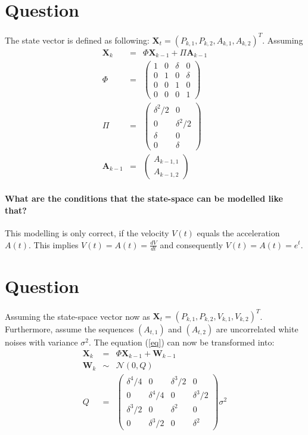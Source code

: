 \documentclass[a4paper, 12pt, titlepage]{article}
\begin{document}
\section{Question}

The state vector is defined as following: $\pmb{X}_t=(P_{k,1},P_{k,2},A_{k,1},A_{k,2})^T$.
Assuming 
\begin{eqnarray}
	\pmb{X}_{k} &=& \Phi \pmb{X}_{k-1} + \Pi \pmb{A}_{k-1} \label{eq}\\
	\Phi &=& \left(
		\begin{array}{cccc}
			1 &0 & \delta & 0\\
			0 & 1& 0 & \delta\\
			0 & 0& 1& 0\\
			0 & 0& 0& 1
		\end{array}
	\right)\\
	\Pi &=& \left(
		\begin{array}{cc}
			\delta^2/2 & 0\\
			0 & \delta^2/2\\
			\delta& 0\\
			0 & \delta
		\end{array}
	\right)\\
	\pmb{A}_{k-1} &=& \left (
		\begin{array}{c}
			A_{k-1,1}\\
			A_{k-1,2}
		\end{array}
	\right)
\end{eqnarray}

\paragraph{What are the conditions that the state-space can be modelled like that?}
This modelling is only correct, if the velocity $V(t)$ equals the acceleration $A(t)$. 
This implies $V(t)=A(t)=\frac{dV}{dt}$ and consequently $V(t)=A(t)=e^t$.

\section{Question}

Assuming the state-space vector now as $\pmb{X}_t=(P_{k,1},P_{k,2},V_{k,1},V_{k,2})^T$.
Furthermore, assume the sequences $(A_{t,1})$ and $(A_{t,2})$ are uncorrelated white noises with variance $\sigma^2$.
The equation (\ref{eq}) can now be transformed into:
\begin{eqnarray}
	\pmb{X}_{k} &=& \Phi \pmb{X}_{k-1} + \pmb{W}_{k-1}\\
	\pmb{W}_{k} &\sim& \mathcal{N}(0,Q)\\
	Q&=& \left(
		\begin{array}{cccc}
		\delta^4/4& 0& \delta^3/2 & 0\\
		0 & \delta^4/4 & 0& \delta^3/2\\
		\delta^3/2 & 0& \delta^2 &0\\
		0 & \delta^3/2 & 0 & \delta^2
		\end{array}
	\right)\sigma^2
\end{eqnarray}
\end{document}
